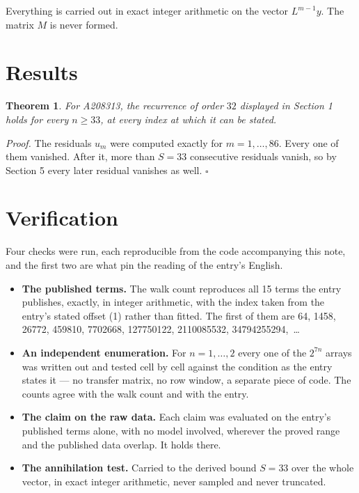 \documentclass[11pt]{article}
\newtheorem{theorem}{Theorem}
\theoremstyle{definition}
\begin{document}
Everything is carried out in exact integer arithmetic on the vector $L^{m-1}y$. The matrix $M$ is never formed.

\section{Results}

\begin{theorem} For A208313, the recurrence of order $32$ displayed in Section 1 holds for every $n \ge 33$, at every index at which it can be stated.\end{theorem}

{\itshape Proof.} The residuals $u_m$ were computed exactly for $m = 1,\dots,86$. Every one of them vanished. After it, more than $S = 33$ consecutive residuals vanish, so by Section 5 every later residual vanishes as well. $\square$

\section{Verification}

Four checks were run, each reproducible from the code accompanying this note, and the first two are what pin the reading of the entry's English.

\begin{itemize}

\item {\bfseries The published terms.} The walk count reproduces all 15 terms the entry publishes, exactly, in integer arithmetic, with the index taken from the entry's stated offset (1) rather than fitted. The first of them are 64, 1458, 26772, 459810, 7702668, 127750122, 2110085532, 34794255294,~\dots

\item {\bfseries An independent enumeration.} For $n = 1,\dots,2$ every one of the $2^{7n}$ arrays was written out and tested cell by cell against the condition as the entry states it --- no transfer matrix, no row window, a separate piece of code. The counts agree with the walk count and with the entry.

\item {\bfseries The claim on the raw data.} Each claim was evaluated on the entry's published terms alone, with no model involved, wherever the proved range and the published data overlap. It holds there.

\item {\bfseries The annihilation test.} Carried to the derived bound $S = 33$ over the whole vector, in exact integer arithmetic, never sampled and never truncated.

\end{itemize}
\end{document}

